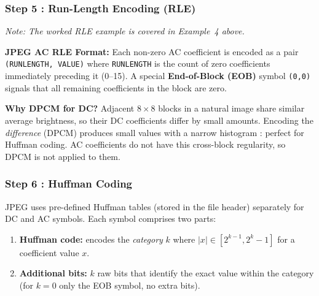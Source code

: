 \subsubsection{Step 5 : Run-Length Encoding (RLE)}

\noindent\textit{Note: The worked RLE example is covered in Example~4 above.}

\begin{definitionbox}
\textbf{JPEG AC RLE Format:} Each non-zero AC coefficient is encoded as a pair \texttt{(RUNLENGTH, VALUE)} where \texttt{RUNLENGTH} is the count of zero coefficients immediately preceding it (0--15). A special \textbf{End-of-Block (EOB)} symbol \texttt{(0,0)} signals that all remaining coefficients in the block are zero.
\end{definitionbox}

\begin{importantbox}
\textbf{Why DPCM for DC?} Adjacent $8\times8$ blocks in a natural image share similar average brightness, so their DC coefficients differ by small amounts. Encoding the \emph{difference} (DPCM) produces small values with a narrow histogram : perfect for Huffman coding. AC coefficients do not have this cross-block regularity, so DPCM is not applied to them.
\end{importantbox}

\subsubsection{Step 6 : Huffman Coding}

JPEG uses pre-defined Huffman tables (stored in the file header) separately for DC and AC symbols. Each symbol comprises two parts:

\begin{enumerate}[nosep]
  \item \textbf{Huffman code:} encodes the \emph{category} $k$ where $|x|\in[2^{k-1},2^k-1]$ for a coefficient value $x$.
  \item \textbf{Additional bits:} $k$ raw bits that identify the exact value within the category (for $k=0$ only the EOB symbol, no extra bits).
\end{enumerate}


